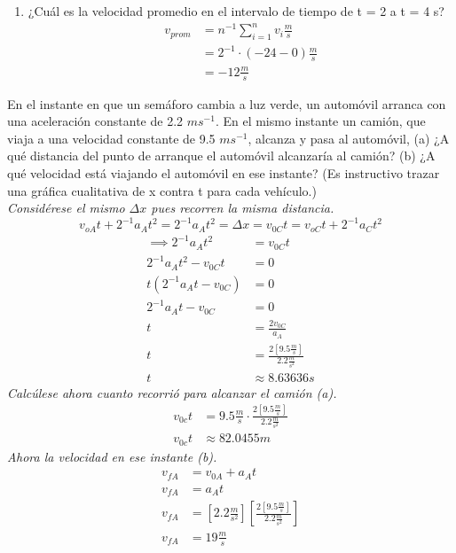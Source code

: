 \documentclass{article}
\begin{document}
\begin{enumerate}
\item ¿Cuál es la velocidad promedio en el intervalo de tiempo de t = 2 a t = 4 s?\\
\begin{align*}
    v_{prom} &= n^{-1} \sum_{i=1}^n v_i \frac{m}{s}\\
    &= 2^{-1} \cdot (-24 - 0) \frac{m}{s}\\
    &= -12 \frac{m}{s}
\end{align*}
\end{enumerate}
\newpage

En el instante en que un semáforo cambia a luz verde, un automóvil arranca con una aceleración constante de 2.2 $ms^{-1}$. En el mismo instante un camión, que viaja a una velocidad constante de 9.5 $ms^{-1}$, alcanza y pasa al automóvil, (a) ¿A qué distancia del punto de arranque el automóvil alcanzaría al camión? (b) ¿A qué velocidad está viajando el automóvil en ese instante? (Es instructivo trazar una gráfica cualitativa de x contra t para cada vehículo.)\\
\textit{Considérese el mismo $\Delta x$ pues recorren la misma distancia.}
$$ v_{oA}t + 2^{-1}a_At^2 = 2^{-1}a_At^2 = \Delta x = v_{0C}t = v_{oC}t + 2^{-1}a_Ct^2$$
\begin{align*}
    \implies 2^{-1}a_At^2 &= v_{0C}t \\
    2^{-1}a_At^2 - v_{0C}t &= 0 \\
    t(2^{-1}a_At - v_{0C}) &= 0 \\
    2^{-1}a_At - v_{0C} &= 0 \\
    t &= \frac{2v_{0C}}{a_A} \\
    t &= \frac{2[9.5 \frac{m}{s}]}{2.2 \frac{m}{s^2}} \\
    t &\approx 8.63636 s
\end{align*}
\textit{Calcúlese ahora cuanto recorrió para alcanzar el camión (a).}
\begin{align*}
    v_{0c}t &= 9.5\frac{m}{s} \cdot \frac{2[9.5 \frac{m}{s}]}{2.2 \frac{m}{s^2}} \\
    v_{0c}t &\approx 82.0455m
\end{align*}
\textit{Ahora la velocidad en ese instante (b).}
\begin{align*}
    v_{fA} &= v_{0A} + a_At \\
    v_{fA} &= a_At \\
    v_{fA} &= [2.2 \frac{m}{s^2}]\left[\frac{2[9.5 \frac{m}{s}]}{2.2 \frac{m}{s^2}} \right] \\
    v_{fA} &= 19 \frac{m}{s}
\end{align*}
\end{document}
